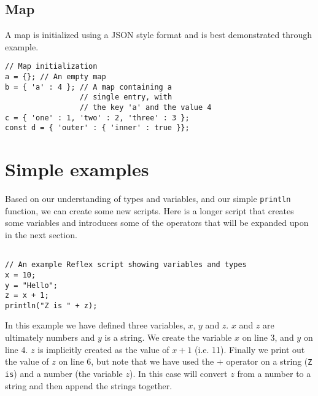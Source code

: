 \subsection{Map}
A map  is initialized using a JSON style format and is best demonstrated through example.
\begin{lstlisting}[caption={Map initialization}]
// Map initialization
a = {}; // An empty map
b = { 'a' : 4 }; // A map containing a 
                 // single entry, with 
                 // the key 'a' and the value 4
c = { 'one' : 1, 'two' : 2, 'three' : 3 };
const d = { 'outer' : { 'inner' : true }};
\end{lstlisting}
\section{Simple examples}
Based on our understanding of types and variables, and our simple \Verb+println+ function, we can create some new \Reflex scripts. Here is a longer script that creates some variables and introduces some of the operators that will be expanded upon in the next section.

\begin{lstlisting}[caption={Variables and Types}]

// An example Reflex script showing variables and types
x = 10;
y = "Hello";
z = x + 1;
println("Z is " + z);
\end{lstlisting}

In this example we have defined three variables, $x$, $y$ and $z$. $x$ and $z$ are ultimately numbers and $y$ is a string. We create the variable $x$ on line 3, and $y$ on line 4. $z$ is implicitly created as the value of $x+1$ (i.e. 11). Finally we print out the value of $z$ on line 6, but note that we have used the $+$ operator on a string (\Verb+Z is+) and a number (the variable $z$). In this case \Reflex will convert $z$ from a number to a string and then append the strings together.

